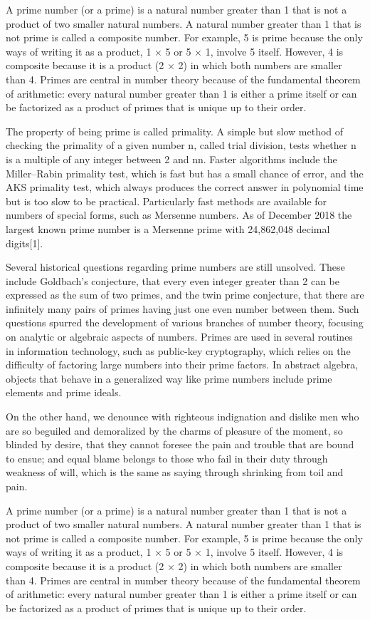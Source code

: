 A prime number (or a prime) is a natural number greater than 1 that is not a
product of two smaller natural numbers. A natural number greater than 1 that is
not prime is called a composite number. For example, 5 is prime because the only
ways of writing it as a product, 1 × 5 or 5 × 1, involve 5 itself. However, 4 is
composite because it is a product (2 × 2) in which both numbers are smaller than
4. Primes are central in number theory because of the fundamental theorem of
arithmetic: every natural number greater than 1 is either a prime itself or can
be factorized as a product of primes that is unique up to their order.

The property of being prime is called primality. A simple but slow method of
checking the primality of a given number n, called trial
division, tests whether n is a multiple of any integer between
2 and { { {n}}}{ {n}}. Faster algorithms include the
Miller–Rabin primality test, which is fast but has a small chance of error, and
the AKS primality test, which always produces the correct answer in polynomial
time but is too slow to be practical. Particularly fast methods are available
for numbers of special forms, such as Mersenne numbers. As of December 2018 the
largest known prime number is a Mersenne prime with 24,862,048 decimal
digits[1].

Several historical questions regarding prime numbers are still unsolved. These
include Goldbach's conjecture, that every even integer greater than 2 can be
expressed as the sum of two primes, and the twin prime conjecture, that there
are infinitely many pairs of primes having just one even number between
them. Such questions spurred the development of various branches of number
theory, focusing on analytic or algebraic aspects of numbers. Primes are used in
several routines in information technology, such as public-key cryptography,
which relies on the difficulty of factoring large numbers into their prime
factors. In abstract algebra, objects that behave in a generalized way like
prime numbers include prime elements and prime ideals.

On the other hand, we denounce with righteous indignation and dislike men who
are so beguiled and demoralized by the charms of pleasure of the moment, so
blinded by desire, that they cannot foresee the pain and trouble that are bound
to ensue; and equal blame belongs to those who fail in their duty through
weakness of will, which is the same as saying through shrinking from toil and
pain.

A prime number (or a prime) is a natural number greater than 1 that is not a
product of two smaller natural numbers. A natural number greater than 1 that is
not prime is called a composite number. For example, 5 is prime because the only
ways of writing it as a product, 1 × 5 or 5 × 1, involve 5 itself. However, 4 is
composite because it is a product (2 × 2) in which both numbers are smaller than
4. Primes are central in number theory because of the fundamental theorem of
arithmetic: every natural number greater than 1 is either a prime itself or can
be factorized as a product of primes that is unique up to their order.

